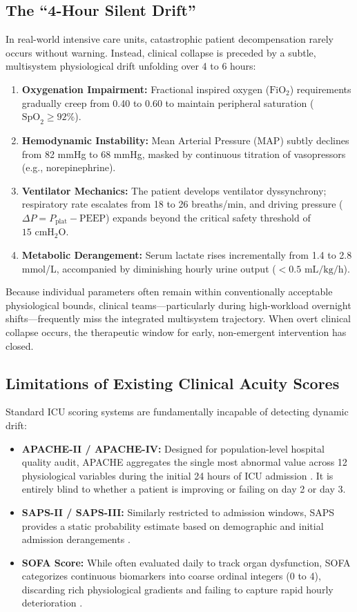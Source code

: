 \documentclass[journal]{IEEEtran}
\begin{document}
\subsection{The ``4-Hour Silent Drift''}
In real-world intensive care units, catastrophic patient decompensation rarely occurs without warning. Instead, clinical collapse is preceded by a subtle, multisystem physiological drift unfolding over 4 to 6 hours:
\begin{enumerate}
    \item \textbf{Oxygenation Impairment:} Fractional inspired oxygen ($\text{FiO}_2$) requirements gradually creep from 0.40 to 0.60 to maintain peripheral saturation ($\text{SpO}_2 \ge 92\%$).
    \item \textbf{Hemodynamic Instability:} Mean Arterial Pressure (MAP) subtly declines from 82 mmHg to 68 mmHg, masked by continuous titration of vasopressors (e.g., norepinephrine).
    \item \textbf{Ventilator Mechanics:} The patient develops ventilator dyssynchrony; respiratory rate escalates from 18 to 26 breaths/min, and driving pressure ($\Delta P = P_{\text{plat}} - \text{PEEP}$) expands beyond the critical safety threshold of $15\text{ cmH}_2\text{O}$.
    \item \textbf{Metabolic Derangement:} Serum lactate rises incrementally from 1.4 to 2.8 mmol/L, accompanied by diminishing hourly urine output ($< 0.5\text{ mL/kg/h}$).
\end{enumerate}

Because individual parameters often remain within conventionally acceptable physiological bounds, clinical teams---particularly during high-workload overnight shifts---frequently miss the integrated multisystem trajectory. When overt clinical collapse occurs, the therapeutic window for early, non-emergent intervention has closed.

\subsection{Limitations of Existing Clinical Acuity Scores}
Standard ICU scoring systems are fundamentally incapable of detecting dynamic drift:
\begin{itemize}
    \item \textbf{APACHE-II / APACHE-IV:} Designed for population-level hospital quality audit, APACHE aggregates the single most abnormal value across 12 physiological variables during the initial 24 hours of ICU admission \cite{zimmerman2006}. It is entirely blind to whether a patient is improving or failing on day 2 or day 3.
    \item \textbf{SAPS-II / SAPS-III:} Similarly restricted to admission windows, SAPS provides a static probability estimate based on demographic and initial admission derangements \cite{legall1993}.
    \item \textbf{SOFA Score:} While often evaluated daily to track organ dysfunction, SOFA categorizes continuous biomarkers into coarse ordinal integers (0 to 4), discarding rich physiological gradients and failing to capture rapid hourly deterioration \cite{vincent1996}.
\end{itemize}
\end{document}
